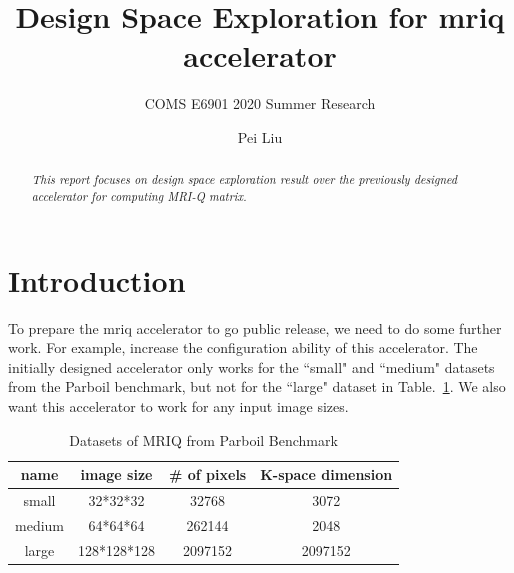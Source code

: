 \documentclass{sig-alternate}
\begin{document}
\title{\Large\bf Design Space Exploration for mriq accelerator}
\subtitle{\normalsize COMS E6901 2020 Summer Research}

\author{
\alignauthor
Pei Liu\\
\vspace{0.2cm}
}

\vspace{-2cm}

\maketitle

\vspace{-2cm}

\begin{abstract}
{\small\em
  This report focuses on design space exploration result over the previously designed accelerator for computing MRI-Q matrix.
}
\end{abstract}

\section{Introduction}
\label{sec:intro}
To prepare the mriq accelerator to go public release, we need to do some further work. For example, increase the configuration ability of this accelerator. The initially designed accelerator only works for the ``small" and ``medium" datasets from the Parboil benchmark, but not for the ``large" dataset in Table.~\ref{tab-1}. We also want this accelerator to work for any input image sizes.
\begin{table}[h!]
    \centering
    \begin{tabular}{c|c|c|c}
    \hline
       name  & image size & \# of pixels & K-space dimension  \\
    \hline
        small  & 32*32*32 & 32768 & 3072 \\
        medium & 64*64*64 & 262144 & 2048\\
        large & 128*128*128 & 2097152 & 2097152\\
        \hline
    \end{tabular}
    \caption{Datasets of MRIQ from Parboil Benchmark}
    \label{tab-1}
\end{table}

\end{document}
